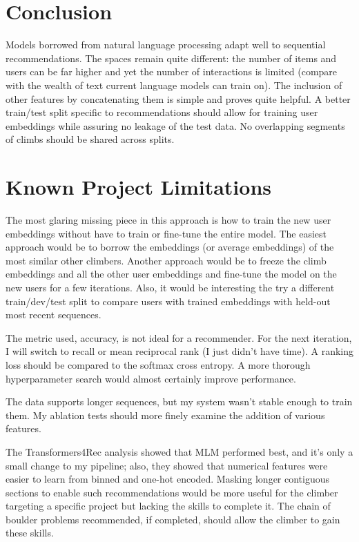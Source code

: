 \documentclass[10pt]{article}
\begin{document}
\section{Conclusion} 

Models borrowed from natural language processing adapt well to sequential recommendations. The spaces remain quite different: the number of items and users can be far higher and yet the number of interactions is limited (compare with the wealth of text current language models can train on). The inclusion of other features by concatenating them is simple and proves quite helpful. A better train/test split specific to recommendations should allow for training user embeddings while assuring no leakage of the test data. No overlapping segments of climbs should be shared across splits. 


\section*{Known Project Limitations}

The most glaring missing piece in this approach is how to train the new user embeddings without have to train or fine-tune the entire model. The easiest approach would be to borrow the embeddings (or average embeddings) of the most similar other climbers. Another approach would be to freeze the climb embeddings and all the other user embeddings and fine-tune the model on the new users for a few iterations. Also, it would be interesting the try a different train/dev/test split to compare users with trained embeddings with held-out most recent sequences. 

The metric used, accuracy, is not ideal for a recommender. For the next iteration, I will switch to recall or mean reciprocal rank (I just didn't have time). A ranking loss should be compared to the softmax cross entropy. A more thorough hyperparameter search would almost certainly improve performance. 

The data supports longer sequences, but my system wasn't stable enough to train them. My ablation tests should more finely examine the addition of various features.

The Transformers4Rec analysis showed that MLM performed best, and it's only a small change to my pipeline; also, they showed that numerical features were easier to learn from binned and one-hot encoded. Masking longer contiguous sections to enable such recommendations would be more useful for the climber targeting a specific project but lacking the skills to complete it. The chain of boulder problems recommended, if completed, should allow the climber to gain these skills.  
\end{document}
